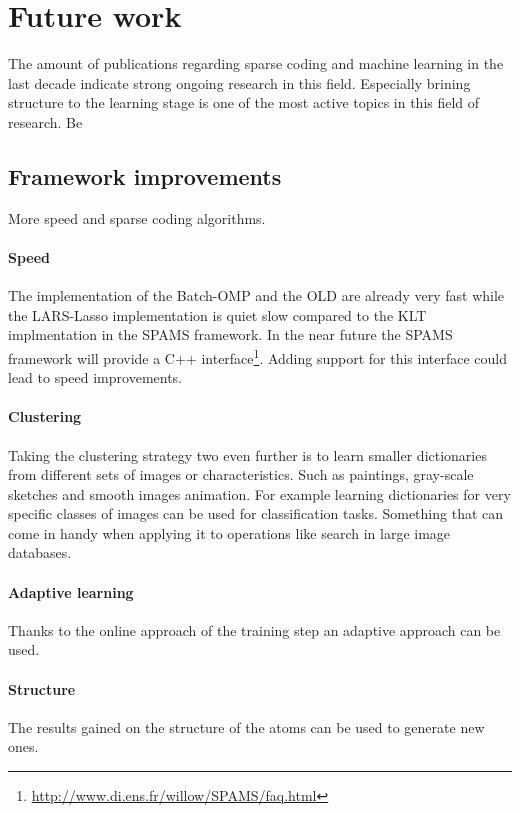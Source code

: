\section{Future work}
The amount of publications regarding sparse coding and machine learning in the
last decade indicate strong ongoing research in this field. Especially
brining structure to the learning stage is one of the most active topics in this
field of research. Be



\subsection{Framework improvements}
More speed and sparse coding algorithms.
\paragraph{Speed}
The implementation of the Batch-OMP and the OLD are already very fast while the
LARS-Lasso implementation is quiet slow compared to the KLT implmentation in the
SPAMS framework. In the near future the SPAMS framework will provide a C++
interface\footnote{\url{http://www.di.ens.fr/willow/SPAMS/faq.html}}. Adding
support for this interface could lead to speed improvements.

\paragraph{Clustering}
Taking the clustering strategy two even further is to learn smaller dictionaries
from different sets of images or characteristics. Such as paintings, gray-scale
sketches and smooth images animation. For example learning dictionaries for very
specific classes of images can be used for classification tasks. Something
that can come in handy when applying it to operations like search in large image
databases.

\paragraph{Adaptive learning}
Thanks to the online approach of the training step an adaptive approach can be
used. 

\paragraph{Structure}
The results gained on the structure of the atoms can be used to generate new
ones.


